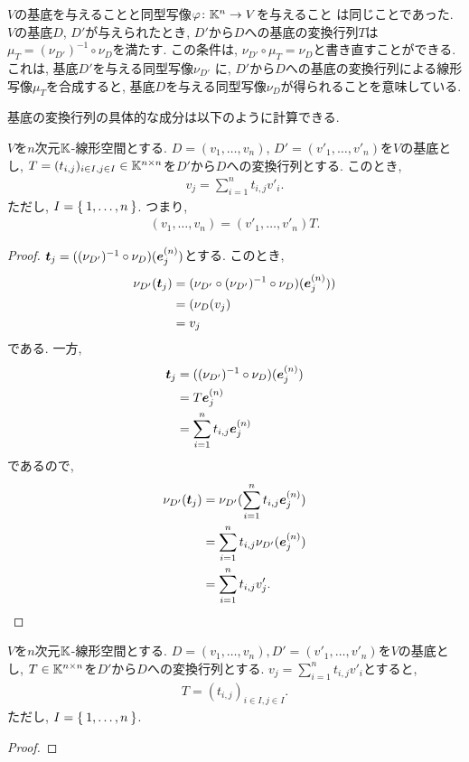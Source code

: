 \begin{remark}
  $V$の基底を与えることと同型写像$\varphi\colon \mathbb{K}^n\to V$を与えること
  は同じことであった.
  $V$の基底$D$, $D'$が与えられたとき, $D'$から$D$への基底の変換行列$T$は
  $\mu_T=(\nu_{D'})^{-1}\circ\nu_{D}$を満たす.
  この条件は,
  $\nu_{D'}\circ\mu_T=\nu_{D}$と書き直すことができる.
  これは,
  基底$D'$を与える同型写像$\nu_{D'}$
  に, $D'$から$D$への基底の変換行列による線形写像$\mu_T$を合成すると,
  基底$D$を与える同型写像$\nu_{D}$が得られることを意味している.
\end{remark}
基底の変換行列の具体的な成分は以下のように計算できる.
\begin{prop}
  \label{thm:trasmat:description}
  $V$を$n$次元$\mathbb{K}$-線形空間とする.
  $D=(v_1,\ldots, v_n)$,
  $D'=(v'_1,\ldots, v'_n)$を$V$の基底とし,
  $T=(t_{i,j})_{i\in I, j\in I}\in\mathbb{K}^{n\times n}$を$D'$から$D$への変換行列とする.
  このとき,
  \begin{align*}
    v_j=\sum_{i=1}^n t_{i,j}v'_i.
  \end{align*}
  ただし, $I=\Set{1,\ldots, n} $.
  つまり,
  \begin{align*}
    (v_1,\ldots, v_n)=(v'_1,\ldots, v'_n)T.
  \end{align*}
\end{prop}
\begin{proof}
  $\boldsymbol{t}_j=((\nu_{D'})^{-1}\circ\nu_{D})(\boldsymbol{e}^{(n)}_j)$とする.
  このとき,
  \begin{align*}
     \nu_{D'}(\boldsymbol{t}_j)
    &=(\nu_{D'}\circ(\nu_{D'})^{-1}\circ\nu_{D})(\boldsymbol{e}^{(n)}_j))\\
    &=(\nu_{D}(v_j)\\
    &=v_j
  \end{align*}
  である.
  一方,
  \begin{align*}
    \boldsymbol{t}_j&=((\nu_{D'})^{-1}\circ\nu_{D})(\boldsymbol{e}^{(n)}_j)\\
    &=T\boldsymbol{e}^{(n)}_j\\
    &=\sum_{i=1}^n t_{i,j}\boldsymbol{e}^{(n)}_j
  \end{align*}
  であるので,
  \begin{align*}
    \nu_{D'}(\boldsymbol{t}_j)
    &=\nu_{D'}(\sum_{i=1}^n t_{i,j}\boldsymbol{e}^{(n)}_j)\\
    &=\sum_{i=1}^n t_{i,j}\nu_{D'}(\boldsymbol{e}^{(n)}_j)\\
    &=\sum_{i=1}^n t_{i,j}v'_j.
  \end{align*}
\end{proof}

\begin{prop}
  $V$を$n$次元$\mathbb{K}$-線形空間とする.
  $D=(v_1,\ldots, v_n),D'=(v'_1,\ldots, v'_n)$を$V$の基底とし,
  $T\in\mathbb{K}^{n\times n}$を$D'$から$D$への変換行列とする.
  $v_j=\sum_{i=1}^n t_{i,j}v'_i$とすると,
  \begin{align*}
    T=(t_{i,j})_{i\in I, j\in I}.
  \end{align*}
  ただし, $I=\Set{1,\ldots, n} $.
\end{prop}
\begin{proof}\end{proof}

